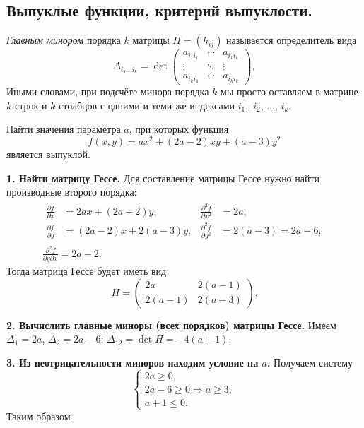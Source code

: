 \subsection{Выпуклые функции, критерий выпуклости.}
\begin{definition}
  \emph{Главным минором} порядка $ k $ матрицы $ H = (h_{ij}) $ называется
  определитель вида 
  \[
    \Delta_{i_1\ldots i_k} = \det \begin{pmatrix}
      a_{i_1i_1} & \cdots & a_{i_1i_k} \\
      \vdots & \ddots & \vdots \\
      a_{i_ki_1} & \cdots & a_{i_ki_k}
    \end{pmatrix},
  \]
 Иными словами, при подсчёте минора порядка $ k $ мы просто оставляем в матрице
 $ k $ строк и $ k $ столбцов с одними и теми же индексами $ i_1, $ $ i_2 $, $ \ldots $, $ i_k $.
\end{definition}

\begin{example}
  Найти значения параметра $ a $, при которых функция 
  \[
      f(x, y) = ax^2 + (2a-2)xy + (a-3)y^2
  \]
  является выпуклой.
  \begin{solution}
    \textbf{1. Найти матрицу Гессе.} Для составление матрицы Гессе нужно найти
    производные второго порядка: 
    \begin{gather*}
    \begin{aligned}
      \frac{\partial f}{\partial x} &= 2ax + (2a-2)y, & \frac{\partial^2
      f}{\partial x^2} &=2a, \\
      \frac{\partial f}{\partial y} &= (2a-2)x + 2(a-3) y, & \frac{\partial^2
      f}{\partial y^2} &= 2(a-3) = 2a - 6,
    \end{aligned} \\ 
    \frac{\partial^2 f}{\partial y \partial x} = 2a -2.
  \end{gather*}
  Тогда матрица Гессе будет иметь вид 
  \[
      H = \begin{pmatrix}
        2a & 2(a-1) \\
        2(a-1) & 2(a-3)
      \end{pmatrix}.
  \]

  \textbf{2. Вычислить главные миноры (всех порядков) матрицы Гессе.} Имеем $
  \Delta_1 = 2a $, $ \Delta_2 = 2a -6 $; $ \Delta_{12} = \det H = -4(a+1) $.

  \textbf{3. Из неотрицательности миноров находим условие на $ a $.} Получаем
  систему  
  \[
      \begin{cases}
        2a \geqslant 0, \\
        2a - 6 \geqslant 0 \Rightarrow a \geqslant 3, \\
        a + 1 \leqslant 0.
      \end{cases}
  \]
  Таким образом  
    
  \end{solution}
\end{example}

